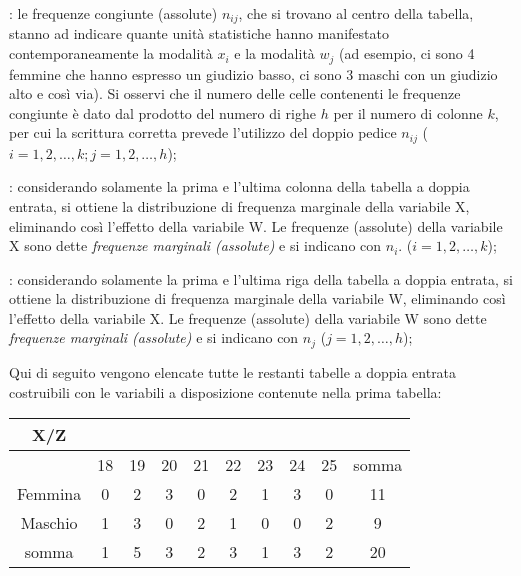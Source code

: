 \begin{description} [noitemsep]
        \item [distribuzione congiunta di X e di W]: 
le frequenze congiunte (assolute) $n_{ij}$, 
che si trovano al centro della tabella, 
stanno ad indicare quante unità statistiche hanno manifestato 
contemporaneamente la modalità $x_i$ e la modalità $w_j$ (ad esempio, ci 
sono 4 femmine che hanno espresso un giudizio basso, ci sono 3 maschi con 
un giudizio alto e così via). Si osservi che il numero delle celle 
contenenti le frequenze congiunte è dato dal prodotto del numero di righe 
$h$ per il numero di colonne $k$, per cui la scrittura corretta prevede 
l'utilizzo del doppio pedice $n_{ij}$ ($i=1,2,\dots,k; j=1,2,\dots,h$);
        \item [distribuzione marginale di X]: 
considerando solamente 
la prima e l'ultima colonna della tabella a doppia entrata, si ottiene la 
distribuzione di frequenza marginale della variabile X, eliminando così 
l'effetto della variabile W. Le frequenze (assolute) della variabile X sono 
dette \emph{frequenze marginali (assolute)} e si indicano con $n_i$. 
($i=1,2,\dots,k$);
        \item [distribuzione marginale di W]: 
considerando solamente 
la prima e l'ultima riga della tabella a doppia entrata, si ottiene la 
distribuzione di frequenza marginale della variabile W, eliminando così 
l'effetto della variabile X. Le frequenze (assolute) della variabile W sono 
dette \emph{frequenze marginali (assolute)} e si indicano con $n_j$ 
($j=1,2,\dots,h$);
\end{description}

Qui di seguito vengono elencate tutte le restanti tabelle a doppia entrata 
costruibili con le variabili a disposizione contenute nella prima tabella:

\noindent
\begin{tabular}{|c|c|c|c|c|c|c|c|c|c|}
        \hline
X/Z&&&&&&&&&\\ 
\hline
        &18&    19&     20&     21&     22&     23&     24&     25&     
somma\\ 
        \hline
Femmina&        0&      2&      3&      0&      2       &1      &3      
&0      &11\\
\hline
Maschio&        1&      3&      0       &2      &1&     0&      0&      
2&      9\\
\hline
somma & 1&      5&      3&      2&      3&      1&      3       &2      
&20\\
\hline
\end{tabular}

